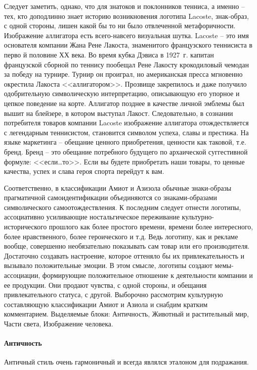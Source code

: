 Следует заметить, однако, что для знатоков и поклонников тенниса, а именно -- тех,
кто доподлинно знает историю возникновения логотипа Lacoste, знак-образ, с одной
стороны, лишен какой бы то ни было отвлеченной метафоричности. Изображение
аллигатора есть всего-навсего визуальная шутка. Lacoste -- это имя основателя
компании Жана Рене Лакоста, знаменитого французского теннисиста в перво
й половине ХХ века. Во время кубка Дэвиса в 1927~г. капитан французской
сборной по теннису пообещал Рене Лакосту крокодиловый чемодан за победу на турнире.
Турнир он проиграл, но американская пресса мгновенно окрестила Лакоста <<аллигатором>>.
Прозвище закрепилось и даже получило одобрительную символическую интерпретацию,
описывающую его упорное и цепкое поведение на корте. Аллигатор позднее в качестве
личной эмблемы был вышит на блейзере, в котором выступал Лакост. Следовательно,
в сознании потребителя товаров компании Lacoste изображение аллигатора
отождествляется с легендарным теннисистом, становится символом успеха, славы и
престижа. На языке маркетинга -- обещание ценного приобретения, ценности как
таковой, т.е. бренд. Бренд -- это обещание потребного будущего по архаической
суггестивной формуле: <<если\ldots то>>. Если вы будете приобретать наши товары,
то ценные качества, успех и слава героя спорта перейдут к вам.

Соответственно, в классификации Амиот и Азизола обычные знаки-образы прагматичной
самоидентификации объединяются со знаками-образами символического
самоотождествления. К последним следует отнести логотипы, ассоциативно усиливающие
ностальгическое переживание культурно\hyp{}исторического прошлого как более
простого времени, времени более интересного, более нравственного, более
героического и т.д. Ведь логотипу, как и рекламе вообще, совершенно необязательно
показывать сам товар или его производителя. Достаточно создавать настроение,
которое оттеняло бы их привлекательность и вызывало положительные эмоции.
В этом смысле, логотипы создают мемы-ассоциации, формирующие положительное
отношение к деятельности компании и ее продукции. Они продают чувства,
с одной стороны, и обещания привлекательного статуса, с другой. Выборочно
рассмотрим культурную составляющую классификации Амиот и Азиола и снабдим кратким
комментарием. Выделяемые блоки: Античность, Животный и растительный мир, Части света, Изображение человека.

\paragraph{Античность}
Античный стиль очень гармоничный и всегда являлся эталоном для подражания.

